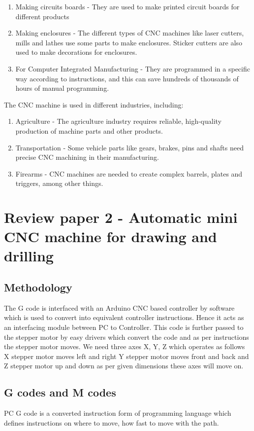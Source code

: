 \begin{enumerate}
 \item Making circuits boards - They are used to make printed circuit boards for different products
 \item Making enclosures - The different types of CNC machines like laser cutters, mills and lathes use some parts to make enclosures. Sticker cutters are also used to make decorations for enclosures.
 \item For Computer Integrated Manufacturing - They are programmed in a specific way according to instructions, and this can save hundreds of thousands of hours of manual programming.
\end{enumerate}

The CNC machine is used in different industries, including:

\begin{enumerate}
 \item Agriculture - The agriculture industry requires reliable, high-quality production of machine parts and other products.
 \item Transportation - Some vehicle parts like gears, brakes, pins and shafts need precise CNC machining in their manufacturing.
 \item Firearms - CNC machines are needed to create complex barrels, plates and triggers, among other things.
\end{enumerate}

\section{Review paper 2 - Automatic mini CNC machine for drawing and drilling} 

\subsection{Methodology}
\cite{irjet_pap} The G code is interfaced with an Arduino CNC based controller by software which is used to convert into equivalent controller instructions. Hence it acts as an interfacing module between PC to Controller. This code is further passed to the stepper motor by easy drivers which convert the code and as per instructions the stepper motor moves. We need three axes X, Y, Z which operates as follows X stepper motor moves left and right Y stepper motor moves front and back and Z stepper motor up and down as per given dimensions these axes will move on.

\subsection{G codes and M codes}
PC G code is a converted instruction form of programming language which defines instructions on where to move, how fast to move with the path.

